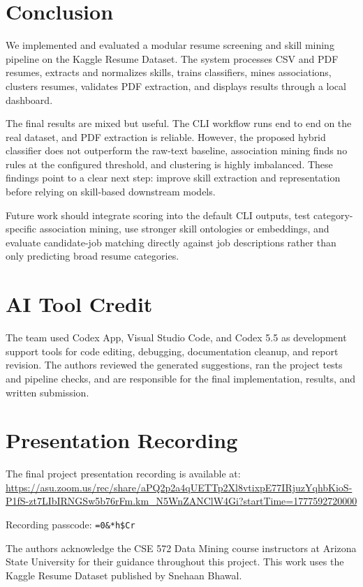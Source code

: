 \documentclass[sigconf, authorversion, nonacm]{acmart}
\begin{document}
\section{Conclusion}

We implemented and evaluated a modular resume screening and skill mining pipeline on the Kaggle Resume Dataset. The system processes CSV and PDF resumes, extracts and normalizes skills, trains classifiers, mines associations, clusters resumes, validates PDF extraction, and displays results through a local dashboard.

The final results are mixed but useful. The CLI workflow runs end to end on the real dataset, and PDF extraction is reliable. However, the proposed hybrid classifier does not outperform the raw-text baseline, association mining finds no rules at the configured threshold, and clustering is highly imbalanced. These findings point to a clear next step: improve skill extraction and representation before relying on skill-based downstream models.

Future work should integrate scoring into the default CLI outputs, test category-specific association mining, use stronger skill ontologies or embeddings, and evaluate candidate-job matching directly against job descriptions rather than only predicting broad resume categories.

\section*{AI Tool Credit}

The team used Codex App, Visual Studio Code, and Codex 5.5 as development support tools for code editing, debugging, documentation cleanup, and report revision. The authors reviewed the generated suggestions, ran the project tests and pipeline checks, and are responsible for the final implementation, results, and written submission.

\section*{Presentation Recording}

The final project presentation recording is available at:
\url{https://asu.zoom.us/rec/share/aPQ2p2a4qUETTp2Xl8vtixpE77IRjuzYqhbKioS-P1fS-zt7LIbIRNGSw5b76rFm.km_N5WnZANClW4Gi?startTime=1777592720000}

Recording passcode: \texttt{=0\&*h\$Cr}

\begin{acks}
The authors acknowledge the CSE 572 Data Mining course instructors at Arizona State University for their guidance throughout this project. This work uses the Kaggle Resume Dataset published by Snehaan Bhawal.
\end{acks}
\end{document}
